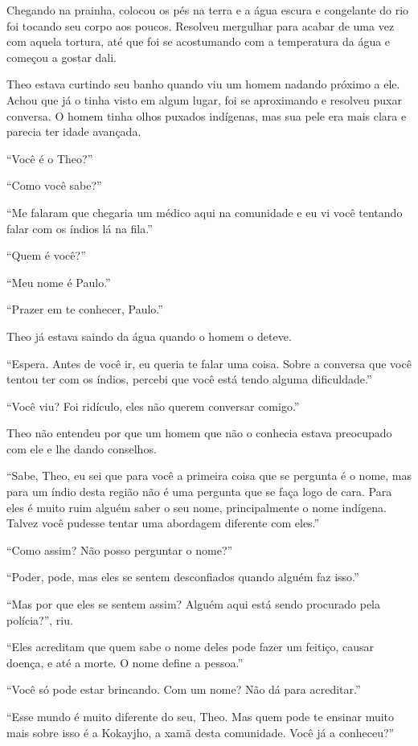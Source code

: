 Chegando na prainha, colocou os pés na terra e a água escura e
congelante do rio foi tocando seu corpo aos poucos. Resolveu mergulhar
para acabar de uma vez com aquela tortura, até que foi se acostumando
com a temperatura da água e começou a gostar dali.

Theo estava curtindo seu banho quando viu um homem nadando próximo
a ele. Achou que já o tinha visto em algum lugar, foi se aproximando e
resolveu puxar conversa. O homem tinha olhos puxados indígenas, mas sua
pele era mais clara e parecia ter idade avançada.

``Você é o Theo?''

``Como você sabe?''

``Me falaram que chegaria um médico aqui na comunidade e eu vi você
tentando falar com os índios lá na fila.''

``Quem é você?''

``Meu nome é Paulo.''

``Prazer em te conhecer, Paulo.''

Theo já estava saindo da água quando o homem o deteve.

``Espera. Antes de você ir, eu queria te falar uma coisa. Sobre a
conversa que você tentou ter com os índios, percebi que você está tendo
alguma dificuldade.''

``Você viu? Foi ridículo, eles não querem conversar comigo.''

Theo não entendeu por que um homem que não o conhecia estava preocupado
com ele e lhe dando conselhos.

``Sabe, Theo, eu sei que para você a primeira coisa que se pergunta é o
nome, mas para um índio desta região não é uma pergunta que se faça logo
de cara. Para eles é muito ruim alguém saber o seu nome, principalmente
o nome indígena. Talvez você pudesse tentar uma abordagem diferente com
eles.''

``Como assim? Não posso perguntar o nome?''

``Poder, pode, mas eles se sentem desconfiados quando alguém faz isso.''

``Mas por que eles se sentem assim? Alguém aqui está sendo procurado pela
polícia?'', riu.

``Eles acreditam que quem sabe o nome deles pode fazer um feitiço,
causar doença, e até a morte. O nome define a pessoa.''

``Você só pode estar brincando. Com um nome? Não dá para acreditar.''

``Esse mundo é muito diferente do seu, Theo. Mas quem pode te ensinar
muito mais sobre isso é a Kokayjho, a xamã desta comunidade. Você já a
conheceu?''

